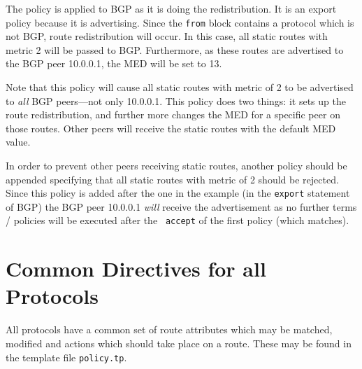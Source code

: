 The policy is applied to BGP as it is doing the redistribution.  It is an export
policy because it is advertising.  Since the {\tt from} block contains a
protocol which is not BGP, route redistribution will occur.  In this case, all
static routes with metric 2 will be passed to BGP.  Furthermore, as these routes
are advertised to the BGP peer 10.0.0.1, the MED will be set to 13.

Note that this policy will cause all static routes with metric of 2 to be
advertised to {\em all} BGP peers---not only 10.0.0.1.  This policy does two
things: it sets up the route redistribution, and further more changes the MED 
for a specific peer on those routes.  Other peers will receive the static routes
with the default MED value.  

In order to prevent other peers receiving static routes, another policy should
be appended specifying that all static routes with metric of 2 should be
rejected.  Since this policy is added after the one in the example (in the
{\tt export} statement of BGP) the BGP peer 10.0.0.1 {\em will} receive the
advertisement as no further terms / policies will be executed after the {\tt
accept} of the first policy (which matches).

\section{Common Directives for all Protocols}
All protocols have a common set of route attributes which may be matched,
modified and actions which should take place on a route.  These may be found in
the template file {\tt policy.tp}. 

